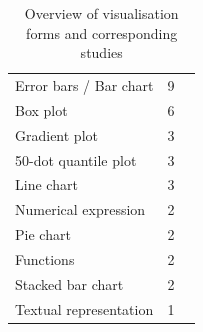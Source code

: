 \documentclass[final,journal,a4paper]{IEEEtran}
\begin{document}
\begin{table}[htbp]
\centering
\caption{Overview of visualisation forms and corresponding studies} \label{tab:visualisations}
\begin{supertabular}{p{3.5cm} p{1cm} p{3cm}}
Error bars / Bar chart & 9 & \cite{Thomas2024, Dikmen2024, Ibrekk1987, Hullman2015, Hgele2022, Chatti2024, Skeels2008, Greis2015, Kay2016} \\
Box plot & 6 & \cite{Brennen2018, Correll2014, Ibrekk1987, Potter2010visualizationofuncertainty, Chatti2024, Skeels2008} \\
Gradient plot & 3 & \cite{Brennen2018, Correll2014, Tak2014} \\
50-dot quantile plot & 3 & \cite{Koval2022, Kay2016, Greis2018} \\
Line chart & 3 & \cite{Koval2022, Chatti2024, Greis2015} \\
Numerical expression & 2 & \cite{Thomas2024, Jenkins2020} \\
Pie chart & 2 & \cite{Ibrekk1987, Chatti2024} \\
Functions & 2 & \cite{Ibrekk1987, Kay2016, Greis2015} \\
Stacked bar chart & 2 & \cite{Chatti2024, Greis2015} \\
Textual representation & 1 & \cite{Greis2015} \\
\end{supertabular}
\end{table}
\end{document}
